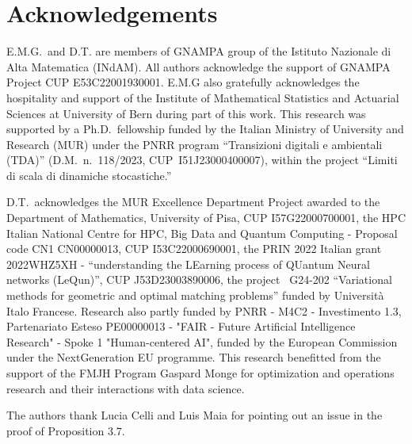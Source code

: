 \documentclass{article}
\theoremstyle{definition}
\theoremstyle{remark}
\numberwithin{equation}{section}
\begin{document}
\section{Acknowledgements}
\label{sec:acknowledgements}

E.M.G.\ and D.T. are members of GNAMPA group of the Istituto Nazionale di Alta Matematica (INdAM). 
All authors acknowledge the support of GNAMPA Project CUP E53C22001930001.
E.M.G also gratefully acknowledges the hospitality and support of the Institute of Mathematical Statistics and Actuarial Sciences at University of Bern during part of this work.
This research was supported by a Ph.D.\ fellowship funded by the Italian Ministry of University and Research (MUR) under the PNRR program “Transizioni digitali e ambientali (TDA)” (D.M.\ n.~118/2023, CUP~I51J23000400007), within the project “Limiti di scala di dinamiche stocastiche.”

D.T.\ acknowledges the MUR Excellence Department Project awarded to the Department of Mathematics, University of Pisa, CUP I57G22000700001, 
the HPC Italian National Centre for HPC, Big Data and Quantum Computing - Proposal code CN1 CN00000013, CUP I53C22000690001, 
the PRIN 2022 Italian grant 2022WHZ5XH - ``understanding the LEarning process of QUantum Neural networks (LeQun)'', CUP J53D23003890006, 
the project  G24-202 ``Variational methods for geometric and optimal matching problems'' funded by Università Italo Francese.
Research also partly funded by PNRR - M4C2 - Investimento 1.3, Partenariato Esteso PE00000013 - "FAIR - Future Artificial Intelligence Research" - Spoke 1 "Human-centered AI", 
funded by the European Commission under the NextGeneration EU programme. 
This research benefitted from the support of the FMJH Program Gaspard Monge for optimization and operations research and their interactions with data science.

The authors thank Lucia Celli and Luis Maia for pointing out an issue in the proof of Proposition 3.7.

%
%
% 
\end{document}
